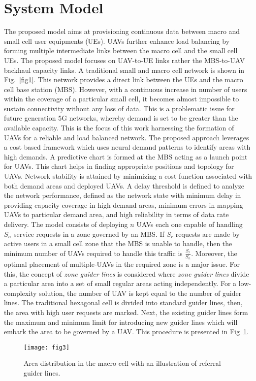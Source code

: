 \documentclass[journal]{IEEEtran}
\begin{document}
\section{System Model}
The proposed model aims at provisioning continuous data between macro and small cell user equipments (UEs). UAVs further enhance load balancing by forming multiple intermediate links between the macro cell and the small cell UEs. The proposed model focuses on UAV-to-UE links rather the MBS-to-UAV backhaul capacity links. A traditional small and macro cell network is shown in Fig.~\ref{fig1}. This network provides a direct link between the UEs and the macro cell base station (MBS). However, with a continuous increase in number of users within the coverage of a particular small cell, it becomes almost impossible to sustain connectivity without any loss of data. This is a problematic issue for future generation 5G networks, whereby demand is set to be greater than the available capacity. This is the focus of this work harnessing the formation of UAVs for a reliable and load balanced network. The proposed approach leverages a cost based framework which uses neural demand patterns to identify areas with high demands. A predictive chart is formed at the MBS acting as a launch point for UAVs. This chart helps in finding appropriate positions and topology for UAVs. Network stability is attained by minimizing a cost function associated with both demand areas and deployed UAVs. A delay threshold is defined to analyze the network performance, defined as the network state with minimum delay in providing capacity coverage in high demand areas, minimum errors in mapping UAVs to particular demand area, and high reliability in terms of data rate delivery. The model consists of deploying $n$ UAVs each one capable of handling $S_{n}$ service requests in a zone governed by an MBS. If $S_{r}$ requests are made by active users in a small cell zone that the MBS is unable to handle, then the minimum number of UAVs required to handle this traffic is $\frac{S_{r}}{S_{n}}$. Moreover, the optimal placement of multiple-UAVs in the required zone is a major issue. For this, the concept of \emph{zone guider lines} is considered where \emph{zone guider lines} divide a particular area into a set of small regular areas acting independently. For a low-complexity solution, the number of UAV is kept equal to the number of guider lines. The traditional hexagonal cell is divided into standard guider lines, then, the area with high user requests are marked. Next, the existing guider lines form the maximum and minimum limit for introducing new guider lines which will embark the area to be governed by a UAV. This procedure is presented in Fig~\ref{fig3}.
\begin{figure}[!hb]
  \centering
\texttt{[image: fig3]}\\
  \caption{Area distribution in the macro cell with an illustration of referral guider lines.}\label{fig3}
\end{figure}
\end{document}
